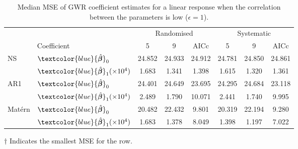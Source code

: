 \documentclass[a4paper]{article} 	%
\newcommand{\Matern}{Mat\'ern }
\newcommand{\zc}[1]{\textcolor{blue}{#1}}
\begin{document}
\begin{table}[!htp]
	\centering
\begin{threeparttable}
	\caption{Median MSE of GWR coefficient estimates for a linear response when the correlation between the parameters is low ($\epsilon=1$).}\label{tb:MSElinear}
	\begin{tabular}{llcccccc}
		\toprule
		&  & \multicolumn{3}{c}{Randomised} & \multicolumn{3}{c}{Systematic} \\ 
   		 & Coefficient & 5  &  9  & AICc & 5   & 9  & AICc \\ \midrule
		\multirow{2}{*}{NS}   & $\zc{\hat{\bm{\beta}}}_0$ & 24.852 &	24.933 &	24.912&	24.781\tnote{$\dagger$} &	24.850 &	24.861 \\ 
		& $\zc{\hat{\bm{\beta}}}_1 (\times 10^4)$ & 1.683 &	1.341 &	1.398 &	1.615 &	1.320\tnote{$\dagger$} &	1.361 \\  \midrule
		\multirow{2}{*}{AR1}  & $\zc{\hat{\bm{\beta}}}_0$ & 24.401 &	24.649 &	23.695 &	24.295 &	24.684 &	23.118\tnote{$\dagger$} \\ 
		& $\zc{\hat{\bm{\beta}}}_1 (\times 10^4)$ & 2.489 &	1.790 &	10.071 &	2.441 &	1.740\tnote{$\dagger$} &	9.995 \\ \midrule
		\multirow{2}{*}{\Matern} & $\zc{\hat{\bm{\beta}}}_0$ & 20.482 &	22.432 &	9.801 &	20.319 &	22.194 &	9.280\tnote{$\dagger$} \\ 
		& $\zc{\hat{\bm{\beta}}}_1 (\times 10^4)$ & 1.683 &	1.378 &	8.049 &	1.398 &	1.197\tnote{$\dagger$} &	7.022 \\
		\bottomrule
	\end{tabular}
	\begin{tablenotes}
	\item[$\dagger$] \footnotesize Indicates the smallest MSE for the row.
	\end{tablenotes}
\end{threeparttable}
\end{table}

\end{document}

